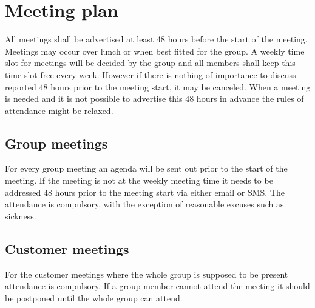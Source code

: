 \section{Meeting plan}
All meetings shall be advertised at least 48 hours before the start of the meeting. Meetings may occur over lunch or when best fitted for the group. A weekly time slot for meetings will be decided by the group and all members shall keep this time slot free every week. However if there is nothing of importance to discuss reported 48 hours prior to the meeting start, it may be canceled. When a meeting is needed and it is not possible to advertise this 48 hours in advance the rules of attendance might be relaxed.
\subsection{Group meetings}
For every group meeting an agenda will be sent out prior to the start of the meeting. If the meeting is not at the weekly meeting time it needs to be addressed 48 hours prior to the meeting start via either email or SMS. The attendance is compulsory, with the exception of reasonable excuses such as sickness.
\subsection{Customer meetings}
For the customer meetings where the whole group is supposed to be present attendance is compulsory. If a group member cannot attend the meeting it should be postponed until the whole group can attend.
